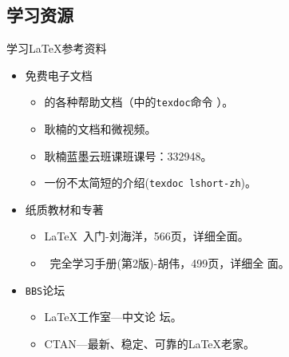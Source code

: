 \documentclass[fontset = adobe, xcolor=svgnames, t, aspectratio=169]{ctexbeamer}
\begin{document}
\subsection{学习资源}
\begin{frame}[t]{学习\LaTeX}{参考资料}
  \stretchon
  \begin{itemize}
  \item \alert{免费}电子文档
    \begin{itemize}
    \item \TeXLive 的各种帮助文档（\TeXLive 中的\alert{\texttt{texdoc}}命令
      ）。
    \item 耿楠的文档和微视频。
    \item 耿楠蓝墨云班课班课号：332948。
    \item 一份不太简短的{\LaTeXe}介绍(\texttt{texdoc lshort-zh})。
    \end{itemize}
  \item 纸质教材和专著
    \begin{itemize}
    \item {\LaTeX}~入门-刘海洋，566页，详细全面。
    \item {\LaTeXe}~完全学习手册(第2版)-胡伟，499页，详细全
      面。
    \end{itemize}
  \item \texttt{BBS}论坛
    \begin{itemize}
    \item {\LaTeX}工作室---中文论
      坛。  
    \item {CTAN}---最新、稳定、可靠的{\LaTeX}老家。    
    \end{itemize}
  \end{itemize}
  \stretchoff
\end{frame}
\end{document}
